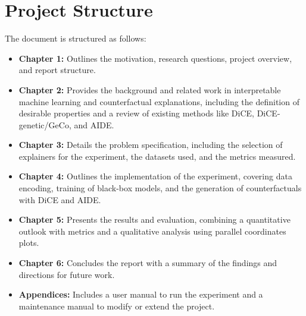 \section{Project Structure}
The document is structured as follows:
\begin{itemize}
    \item \textbf{Chapter 1:} Outlines the motivation, research questions, project overview, and report structure.
    \item \textbf{Chapter 2:} Provides the background and related work in interpretable machine learning and counterfactual explanations, including the definition of desirable properties and a review of existing methods like DiCE, DiCE-genetic/GeCo, and AIDE.
    \item \textbf{Chapter 3:} Details the problem specification, including the selection of explainers for the experiment, the datasets used, and the metrics measured.
    \item \textbf{Chapter 4:} Outlines the implementation of the experiment, covering data encoding, training of black-box models, and the generation of counterfactuals with DiCE and AIDE.
    \item \textbf{Chapter 5:} Presents the results and evaluation, combining a quantitative outlook with metrics and a qualitative analysis using parallel coordinates plots.
    \item \textbf{Chapter 6:} Concludes the report with a summary of the findings and directions for future work.
    \item \textbf{Appendices:} Includes a user manual to run the experiment and a maintenance manual to modify or extend the project.
\end{itemize}